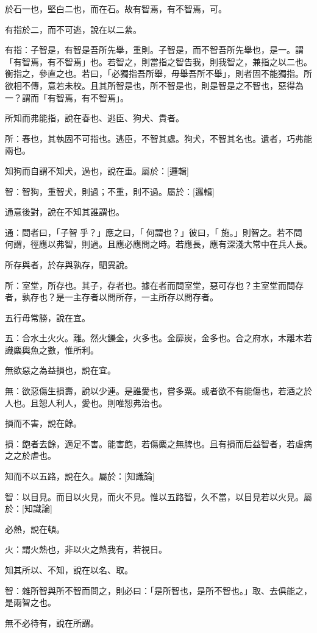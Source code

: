 \begin{pinyinscope}
於石一也，堅白二也，而在石。故有智焉，有不智焉，可。

有指於二，而不可逃，說在以二絫。

有指：子智是，有智是吾所先舉，重則。子智是，而不智吾所先舉也，是一。謂「有智焉，有不智焉」也。若智之，則當指之智告我，則我智之，兼指之以二也。衡指之，參直之也。若曰，「必獨指吾所舉，毋舉吾所不舉」，則者固不能獨指。所欲相不傳，意若未校。且其所智是也，所不智是也，則是智是之不智也，惡得為一？謂而「有智焉，有不智焉」。

所知而弗能指，說在春也、逃臣、狗犬、貴者。

所：春也，其執固不可指也。逃臣，不智其處。狗犬，不智其名也。遺者，巧弗能兩也。

知狗而自謂不知犬，過也，說在重。屬於：[邏輯]

智：智狗，重智犬，則過；不重，則不過。屬於：[邏輯]

通意後對，說在不知其誰謂也。

通：問者曰，「子智𩥡乎？」應之曰，「𩥡何謂也？」彼曰，「𩥡施。」則智之。若不問𩥡何謂，徑應以弗智，則過。且應必應問之時。若應長，應有深淺大常中在兵人長。

所存與者，於存與孰存，駟異說。

所：室堂，所存也。其子，存者也。據在者而問室堂，惡可存也？主室堂而問存者，孰存也？是一主存者以問所存，一主所存以問存者。

五行毋常勝，說在宜。

五：合水土火火。離。然火鑠金，火多也。金靡炭，金多也。合之府水，木離木若識麋輿魚之數，惟所利。

無欲惡之為益損也，說在宜。

無：欲惡傷生損壽，說以少連。是誰愛也，嘗多粟。或者欲不有能傷也，若酒之於人也。且𢜔人利人，愛也。則唯𢜔弗治也。

損而不害，說在餘。

損：飽者去餘，適足不害。能害飽，若傷麋之無脾也。且有損而后益智者，若虐病之之於虐也。

知而不以五路，說在久。屬於：[知識論]

智：以目見。而目以火見，而火不見。惟以五路智，久不當，以目見若以火見。屬於：[知識論]

必熱，說在頓。

火：謂火熱也，非以火之熱我有，若視日。

知其所以、不知，說在以名、取。

智：雜所智與所不智而問之，則必曰：「是所智也，是所不智也。」取、去俱能之，是兩智之也。

無不必待有，說在所謂。


\end{pinyinscope}
